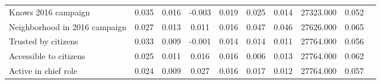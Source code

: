 {\begin{tabular}{l*{9}{c}}
Knows 2016 campaign & 0.035 & 0.016 & -0.003 & 0.019 & 0.025 & 0.014 & 27323.000 & 0.052 \\
Neighborhood in 2016 campaign & 0.027 & 0.013 & 0.011 & 0.016 & 0.047 & 0.046 & 27626.000 & 0.065 \\
Trusted by citizens & 0.033 & 0.009 & -0.001 & 0.014 & 0.014 & 0.011 & 27764.000 & 0.056 \\
Accessible to citizens & 0.025 & 0.011 & 0.016 & 0.016 & 0.006 & 0.013 & 27764.000 & 0.062 \\
Active in chief role & 0.024 & 0.009 & 0.027 & 0.016 & 0.017 & 0.012 & 27764.000 & 0.057 \\
\hline\hline \end{tabular} }
